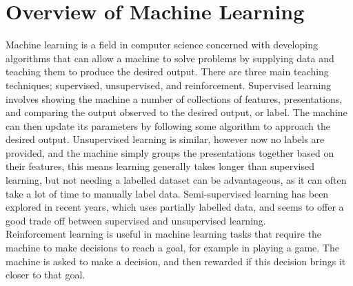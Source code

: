 \documentclass[12pt,a4paper,titlepage]{book}
\begin{document}
\section{Overview of Machine Learning}
	Machine learning is a field in computer science concerned with developing algorithms that can allow a machine to solve problems by supplying data and teaching them to produce the desired output. There are three main teaching techniques; supervised, unsupervised, and reinforcement.\cite{ml-algorithmic-perspective} Supervised learning involves showing the machine a number of collections of features, presentations, and comparing the output observed to the desired output, or label. The machine can then update its parameters by following some algorithm to approach the desired output. Unsupervised learning is similar, however now no labels are provided, and the machine simply groups the presentations together based on their features, this means learning generally takes longer than supervised learning\cite{supervised-vs-unsupervised}, but not needing a labelled dataset can be advantageous, as it can often take a lot of time to manually label data. Semi-supervised learning has been explored in recent years, which uses partially labelled data, and seems to offer a good trade off between supervised and unsupervised learning\cite{semi-supervised}.\\
	Reinforcement learning is useful in machine learning tasks that require the machine to make decisions to reach a goal, for example in playing a game. The machine is asked to make a decision, and then rewarded if this decision brings it closer to that goal.
\end{document}
